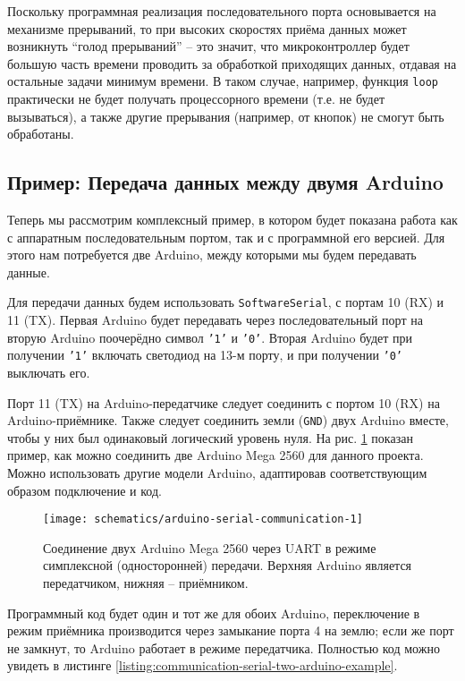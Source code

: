 \documentclass[../sparc.tex]{subfiles}
\begin{document}
Поскольку программная реализация последовательного порта основывается на
механизме прерываний, то при высоких скоростях приёма данных может возникнуть
``голод прерываний'' -- это значит, что микроконтроллер будет большую часть
времени проводить за обработкой приходящих данных, отдавая на остальные задачи
минимум времени.  В таком случае, например, функция \texttt{loop} практически не
будет получать процессорного времени (т.е. не будет вызываться), а также другие
прерывания (например, от кнопок) не смогут быть обработаны.

\subsection{Пример: Передача данных между двумя Arduino}

Теперь мы рассмотрим комплексный пример, в котором будет показана работа как с
аппаратным последовательным портом, так и с программной его версией.  Для этого
нам потребуется две Arduino, между которыми мы будем передавать данные.

Для передачи данных будем использовать \texttt{SoftwareSerial}, с портам 10 (RX)
и 11 (TX).  Первая Arduino будет передавать через последовательный порт на
вторую Arduino поочерёдно символ \texttt{'1'} и \texttt{'0'}.  Вторая Arduino
будет при получении \texttt{'1'} включать светодиод на 13-м порту, и при
получении \texttt{'0'} выключать его.

Порт 11 (TX) на Arduino-передатчике следует соединить с портом 10 (RX) на
Arduino-приёмнике.  Также следует соединить земли (\texttt{GND}) двух Arduino
вместе, чтобы у них был одинаковый логический уровень нуля.  На
рис. \ref{fig:arduino-serial-communication-1} показан пример, как можно
соединить две Arduino Mega 2560 для данного проекта.  Можно использовать другие
модели Arduino, адаптировав соответствующим образом подключение и код.

\begin{figure}[H]
  \centering
  \texttt{[image: schematics/arduino-serial-communication-1]}
  \caption{Соединение двух Arduino Mega 2560 через UART в режиме симплексной
    (односторонней) передачи.  Верхняя Arduino является передатчиком, нижняя --
    приёмником.}
  \label{fig:arduino-serial-communication-1}
\end{figure}

Программный код будет один и тот же для обоих Arduino, переключение в режим
приёмника производится через замыкание порта 4 на землю; если же порт не
замкнут, то Arduino работает в режиме передатчика.  Полностью код можно увидеть
в листинге \ref{listing:communication-serial-two-arduino-example}.
\end{document}
